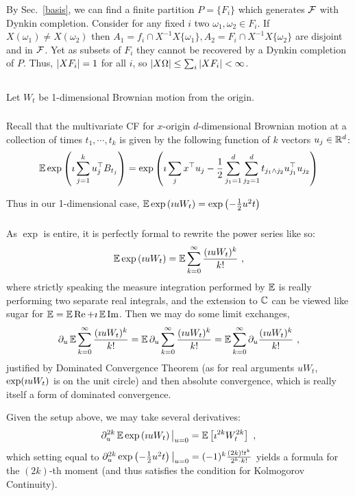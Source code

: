 \documentclass{article}
\begin{document}
     By Sec.~\ref{basis}, we can find a finite partition \(P=\{F_i\}\) which generates \(\mathcal{F}\) with Dynkin completion. Consider for any fixed \(i\) two \(\omega_1,\omega_2\in F_i\). If \(X(\omega_1)\neq X(\omega_2)\) then \(A_1=f_i\cap X^{-1}X\{\omega_1\},A_2=F_i\cap X^{-1}X\{\omega_2\}\) are disjoint and in \(\mathcal{F}\). Yet as subsets of \(F_i\) they cannot be recovered by a Dynkin completion of \(P\). Thus, \(\left\lvert{X F_i}\right\rvert=1\) for all \(i\), so \(\left\lvert{X \Omega}\right\rvert\le\sum_i\left\lvert{XF_i}\right\rvert<\infty\).

     \subsection{}
     Let \(W_t\) be 1-dimensional Brownian motion from the origin.
     \subsubsection{}
     Recall that the multivariate CF for \(x\)-origin \(d\)-dimensional Brownian motion at a collection of times \(t_1,\cdots,t_k\) is given by the following function of \(k\) vectors \(u_j\in\mathbb{R}^d\):
     \[
       \operatorname{\mathbb{E}}\exp\left({\imath\sum_{j=1}^ku_j^\top B_{t_j}}\right)=\exp\left({\imath\sum_j x^\top u_j-\frac{1}{2}\sum_{j_1=1}^d\sum_{j_2=1}^d t_{j_1\land j_2}u_{j_1}^\top u_{j_2}}\right)
     \]

     Thus in our 1-dimensional case, \(\operatorname{\mathbb{E}}\exp\left({\imath u W_t}\right)=\exp\left({-\frac{1}{2}u^2t}\right)\)
     \subsubsection{}

     As \(\exp\) is entire, it is perfectly formal to rewrite the power series like so:
     \[
\operatorname{\mathbb{E}}\exp\left({\imath u W_t}\right)=\operatorname{\mathbb{E}}\sum_{k=0}^\infty\frac{(\imath u W_t)^k}{k!}\,\,,
       \]
     where strictly speaking the measure integration performed by \(\operatorname{\mathbb{E}}\) is really performing two separate real integrals, and the extension to \(\mathbb{C}\) can be viewed like sugar for \(\operatorname{\mathbb{E}}=\operatorname{\mathbb{E}} \operatorname{Re} + \imath\operatorname{\mathbb{E}}\operatorname{Im}\). Then we may do some limit exchanges,
     \[
       \partial_u\operatorname{\mathbb{E}}\sum_{k=0}^\infty\frac{(\imath u W_t)^k}{k!}
       =\operatorname{\mathbb{E}}\partial_u\sum_{k=0}^\infty\frac{(\imath u W_t)^k}{k!}
       =\operatorname{\mathbb{E}}\sum_{k=0}^\infty\partial_u\frac{(\imath u W_t)^k}{k!}
       \,\,,
       \]
       justified by Dominated Convergence Theorem (as for real arguments \(u W_t\), \(\exp(\imath u W_t)\) is on the unit circle) and then absolute convergence, which is really itself a form of dominated convergence.

       Given the setup above, we may take several derivatives:
       \[
         \partial_u^{2k}\operatorname{\mathbb{E}}\exp\left({\imath u W_t}\right)\big|_{u=0}=\operatorname{\mathbb{E}}\left[{\imath^{2k}W_t^{2k}}\right]\,\,,
       \]
       which setting equal to \(\partial_u^{2k}\exp\left({-\frac{1}{2}u^2t}\right)\big|_{u=0}=(-1)^k\frac{(2k)!t^k}{2^k\cdot k!}\) yields a formula for the \((2k)\)-th moment (and thus satisfies the condition for Kolmogorov Continuity).
\end{document}

